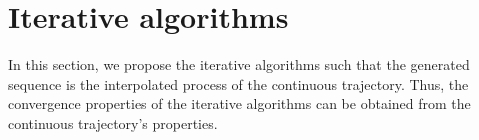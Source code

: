 \documentclass[11pt]{article}
\def\blue#1{\textcolor{blue}{#1}}
\newcommand{\R}{\mathbb R}
\newcommand{\cM}{\mathcal M}
\def\norm#1{\left\|#1\right\|}
\begin{document}



\section{Iterative algorithms}
In this section, we propose the iterative algorithms such that the generated sequence is the interpolated process of the continuous trajectory. Thus, the convergence properties of the iterative algorithms can be obtained from the continuous trajectory's properties.
\end{document}
